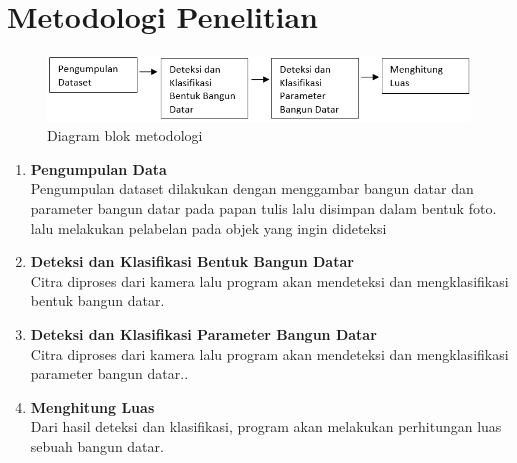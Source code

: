 \section{Metodologi Penelitian}
\begin{figure}[ht]
	\includegraphics[scale=0.7]{gambar/Metodologi.png}
	\caption{Diagram blok metodologi}
	\label{fig:Metodologi}
\end{figure}

\begin{enumerate}
	\item \textbf{Pengumpulan Data} \\
	Pengumpulan dataset dilakukan dengan menggambar bangun datar dan parameter bangun datar pada papan tulis lalu disimpan dalam bentuk foto. lalu melakukan pelabelan pada objek yang ingin dideteksi
	\item \textbf{Deteksi dan Klasifikasi Bentuk Bangun Datar} \\
	Citra diproses dari kamera lalu program akan mendeteksi dan mengklasifikasi bentuk bangun datar.
	\item \textbf{Deteksi dan Klasifikasi Parameter Bangun Datar} \\
	Citra diproses dari kamera lalu program akan mendeteksi dan mengklasifikasi parameter bangun datar..
	\item \textbf{Menghitung Luas} \\
	Dari hasil deteksi dan klasifikasi, program akan melakukan perhitungan luas sebuah bangun datar.
\end{enumerate}









